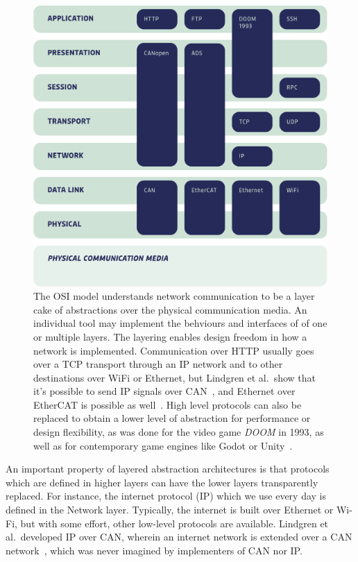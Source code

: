 \documentclass[english,12pt,a4paper,pdftex,eng,utf8]{aaltothesis}
\begin{document}
\begin{figure}[h]
  \centering
  \includegraphics[width=\textwidth]{assets/osi_model}
  \caption{The OSI model understands network communication to be a layer cake of abstractions over the physical communication media.  An individual tool may implement the behviours and interfaces of of one or multiple layers.  The layering enables design freedom in how a network is implemented.  Communication over HTTP usually goes over a TCP transport through an IP network and to other destinations over WiFi or Ethernet, but Lindgren et al.\ show that it's possible to send IP signals over CAN~\cite{Lindgren2008}, and Ethernet over EtherCAT is possible as well~\cite[§1.9.3]{EtherCATFieldbus}.  High level protocols can also be replaced to obtain a lower level of abstraction for performance or design flexibility, as was done for the video game \emph{DOOM} in 1993, as well as for contemporary game engines like Godot or Unity~\cite{DOOM1993,GodotMultiplayer,UnityTransport}.}\label{fig:osi_model}
\end{figure}

An important property of layered abstraction architectures is that protocols which are defined in higher layers can have the lower layers transparently replaced. For instance, the internet protocol (IP) which we use every day is defined in the Network layer. Typically, the internet is built over Ethernet or Wi-Fi, but with some effort, other low-level protocols are available. Lindgren et al.\ developed IP over CAN, wherein an internet network is extended over a CAN network~\cite{Lindgren2008}, which was never imagined by implementers of CAN nor IP.
\end{document}
